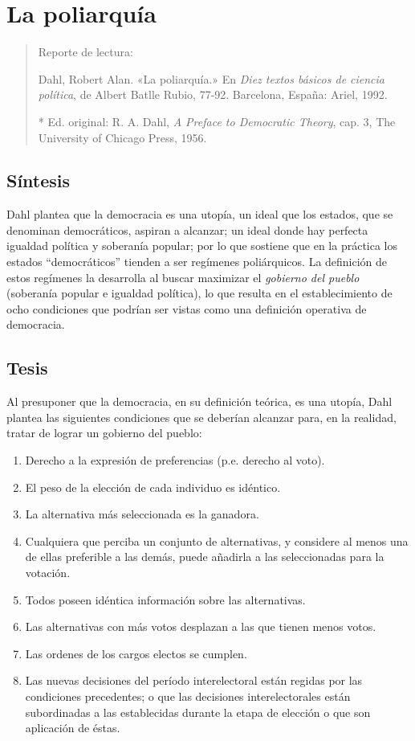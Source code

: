 \documentclass[
  letterpaper,
  DIV=11,
  numbers=noendperiod]{scrreprt}
\begin{document}
\chapter{La poliarquía}\label{poliarquia}

\begin{quote}
Reporte de lectura:

Dahl, Robert Alan. «La poliarquía.» En \emph{Diez textos básicos de
ciencia política}, de Albert Batlle Rubio, 77-92. Barcelona, España:
Ariel, 1992.

* Ed. original: R. A. Dahl, \emph{A Preface to Democratic Theory}, cap.
3, The University of Chicago Press, 1956.
\end{quote}

\section{Síntesis}\label{suxedntesis-1}

Dahl plantea que la democracia es una utopía, un ideal que los estados,
que se denominan democráticos, aspiran a alcanzar; un ideal donde hay
perfecta igualdad política y soberanía popular; por lo que sostiene que
en la práctica los estados ``democráticos'' tienden a ser regímenes
poliárquicos. La definición de estos regímenes la desarrolla al buscar
maximizar el \emph{gobierno del pueblo} (soberanía popular e igualdad
política), lo que resulta en el establecimiento de ocho condiciones que
podrían ser vistas como una definición operativa de democracia.

\section{Tesis}\label{tesis-1}

Al presuponer que la democracia, en su definición teórica, es una
utopía, Dahl plantea las siguientes condiciones que se deberían alcanzar
para, en la realidad, tratar de lograr un gobierno del pueblo:

\begin{enumerate}
\def\labelenumi{\arabic{enumi}.}
\item
  Derecho a la expresión de preferencias (p.e. derecho al voto).
\item
  El peso de la elección de cada individuo es idéntico.
\item
  La alternativa más seleccionada es la ganadora.
\item
  Cualquiera que perciba un conjunto de alternativas, y considere al
  menos una de ellas preferible a las demás, puede añadirla a las
  seleccionadas para la votación.
\item
  Todos poseen idéntica información sobre las alternativas.
\item
  Las alternativas con más votos desplazan a las que tienen menos votos.
\item
  Las ordenes de los cargos electos se cumplen.
\item
  Las nuevas decisiones del período interelectoral están regidas por las
  condiciones precedentes; o que las decisiones interelectorales están
  subordinadas a las establecidas durante la etapa de elección o que son
  aplicación de éstas.
\end{enumerate}
\end{document}
